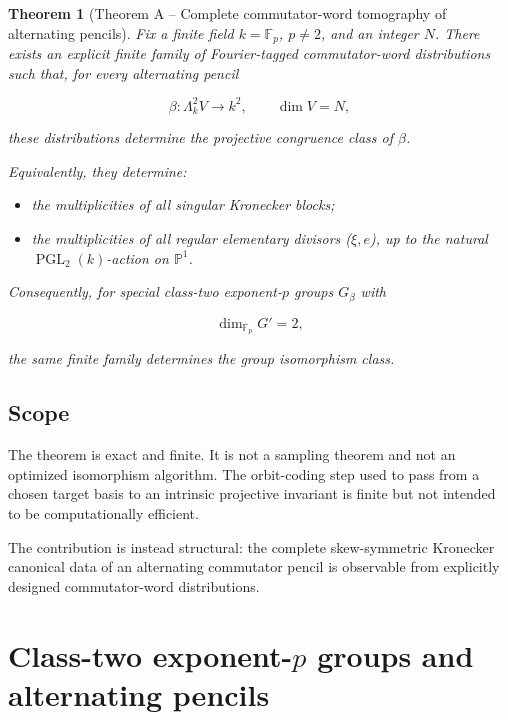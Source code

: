 \documentclass[11pt]{article}
\newtheorem{theorem}{Theorem}[section]
\begin{document}
\begin{theorem}[Theorem A -- Complete commutator-word tomography of alternating pencils]

Fix a finite field $k=\mathbb F_p$, $p\neq2$, and an integer $N$. There exists an explicit finite family of Fourier-tagged commutator-word distributions such that, for every alternating pencil

\[
\beta:\Lambda^2_k V\to k^2,
\qquad
\dim V=N,
\]

these distributions determine the projective congruence class of $\beta$.

Equivalently, they determine:

\begin{itemize}
\item the multiplicities of all singular Kronecker blocks;
\end{itemize}

\begin{itemize}
\item the multiplicities of all regular elementary divisors ($\xi,e$), up to the natural $\operatorname{PGL}_2(k)$-action on $\mathbb P^1$.
\end{itemize}

Consequently, for special class-two exponent-$p$ groups $G_\beta$ with

\[
\dim_{\mathbb F_p}G'=2,
\]

the same finite family determines the group isomorphism class.

\end{theorem}

\subsection{Scope}

The theorem is exact and finite. It is not a sampling theorem and not an optimized isomorphism algorithm. The orbit-coding step used to pass from a chosen target basis to an intrinsic projective invariant is finite but not intended to be computationally efficient.

The contribution is instead structural: the complete skew-symmetric Kronecker canonical data of an alternating commutator pencil is observable from explicitly designed commutator-word distributions.

\section{Class-two exponent-$p$ groups and alternating pencils}
\end{document}
